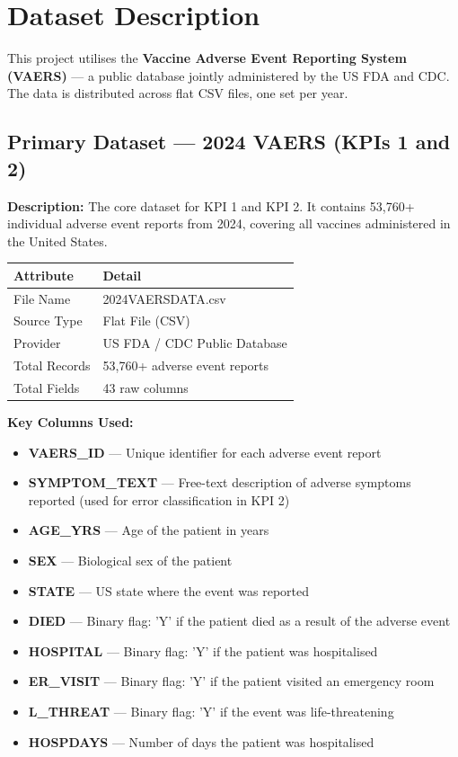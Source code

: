 \documentclass[12pt,a4paper]{report}
\begin{document}
\chapter{Dataset Description}

This project utilises the \textbf{Vaccine Adverse Event Reporting System (VAERS)} — a public database jointly administered by the US FDA and CDC. The data is distributed across flat CSV files, one set per year.

\section{Primary Dataset — 2024 VAERS (KPIs 1 and 2)}

\textbf{Description:} The core dataset for KPI 1 and KPI 2. It contains 53,760+ individual adverse event reports from 2024, covering all vaccines administered in the United States.

\medskip
\begin{tabularx}{\textwidth}{lX}
\toprule
\textbf{Attribute} & \textbf{Detail} \\
\midrule
File Name       & 2024VAERSDATA.csv \\
Source Type     & Flat File (CSV) \\
Provider        & US FDA / CDC Public Database \\
Total Records   & 53,760+ adverse event reports \\
Total Fields    & 43 raw columns \\
\bottomrule
\end{tabularx}

\medskip\noindent\textbf{Key Columns Used:}

\begin{itemize}[leftmargin=*]
  \item \textbf{VAERS\_ID} — Unique identifier for each adverse event report
  \item \textbf{SYMPTOM\_TEXT} — Free-text description of adverse symptoms reported (used for error classification in KPI 2)
  \item \textbf{AGE\_YRS} — Age of the patient in years
  \item \textbf{SEX} — Biological sex of the patient
  \item \textbf{STATE} — US state where the event was reported
  \item \textbf{DIED} — Binary flag: 'Y' if the patient died as a result of the adverse event
  \item \textbf{HOSPITAL} — Binary flag: 'Y' if the patient was hospitalised
  \item \textbf{ER\_VISIT} — Binary flag: 'Y' if the patient visited an emergency room
  \item \textbf{L\_THREAT} — Binary flag: 'Y' if the event was life-threatening
  \item \textbf{HOSPDAYS} — Number of days the patient was hospitalised
\end{itemize}
\end{document}
